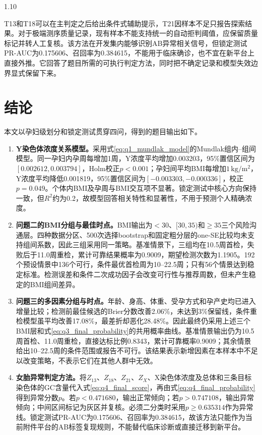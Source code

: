 \documentclass[12pt,a4paper]{ctexrep}
\numberwithin{equation}{section}
\begin{document}
\begin{spacing}{1.10}
{			T13和T18可以在主判定之后给出条件式辅助提示，T21因样本不足只报告探索结果。对于极端测序质量记录，现有样本不能支持统一的自动拒判阈值，应保留质量标记并转人工复核。该方法在开发集内能够识别AB异常相关信号，但锁定测试PR-AUC为0.175606、召回率为0.384615，不能用于临床确诊，也不宜在新平台上直接外推。它回答了题目所需的可执行判定方法，同时把不确定记录和模型失效边界显式保留下来。

			\section{结论}
			本文以孕妇级划分和锁定测试贯穿四问，得到的题目输出如下。
			\begin{enumerate}[label=\arabic*),leftmargin=2.2em,itemsep=4pt,topsep=3pt]
			\item \textbf{Y染色体浓度关系模型。}采用式\eqref{eq:q1_mundlak_model}的Mundlak组内--组间模型。同一孕妇内孕周每增加1周，Y浓度平均增加0.003203，95\%置信区间为$[0.002612,0.003794]$，Holm校正$p<0.001$；孕妇间平均BMI每增加$1\,\mathrm{kg/m^2}$，Y浓度平均降低0.001819，95\%置信区间为$[-0.003303,-0.000336]$，校正$p=0.049$。个体内BMI及孕周与BMI交互项不显著。锁定测试中核心方向保持一致，但$R^2$约为0.2，故模型回答相关特性和显著性，不用于预测个人精确浓度。
			\item \textbf{问题二的BMI分组与最佳时点。}BMI输出为$<30$、$[30,35)$和$\geq35$三个风险沟通层。四种数据分区、500次选择bootstrap和固定粗分层的one-SE比较均未支持组间系数，因此三组采用同一策略。基准情景下，三组均在10.5周首检，失败后于11.0周重检，累计可靠结果概率为0.9009，期望检测次数为1.1905。192个预设情景中136个可行，条件最优首检周为10--22.5周；只有56个情景达到稳定标准。检测误差和条件二次成功因子会改变可行性与推荐周数，但未产生稳定的BMI组间差异。
			\item \textbf{问题三的多因素分组与时点。}年龄、身高、体重、受孕方式和孕产史均已进入增量比较；检测前最佳候选的Brier分数改善2.06\%，未达到3\%保留线，条件重检模型虽平均改善17.08\%，最差折却恶化28.48\%。因此最终仍采用上述三个BMI层和式\eqref{eq:q3_final_probability}的共用概率曲线。基准情景输出仍为10.5周首检、11.0周重检，直接达标比例0.8343，累计可靠概率0.9009；其余情景给出10--22.5周的条件范围或报告不可行。该结果表示新增因素在本样本中不足以改变策略，不表示它们在其他人群中无效。
			\item \textbf{女胎异常判定方法。}将$Z_{13}$、$Z_{18}$、$Z_{21}$、$Z_X$、X染色体浓度及总体和三条目标染色体的GC含量代入式\eqref{eq:q4_final_score}，再由式\eqref{eq:q4_final_probability}得到异常分数$p$。若$p<0.471680$，输出正常倾向；若$p>0.747108$，输出异常倾向；中间区间标记为灰区并复核。必须二分类时采用$p\geq0.635314$作为异常线。锁定测试PR-AUC为0.175606、召回率为0.384615，故该方法只能作为当前附件平台的AB标签复现规则，不能替代临床诊断或直接迁移到新平台。
			\end{enumerate}
		
}
\end{spacing}
\end{document}
